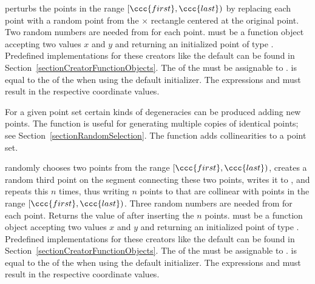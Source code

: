 { perturbs the points in the range $[\ccc{first},\ccc{last})$ by
  replacing each point with a random point from the 
   $\times$  rectangle centered at the original point.
  Two random numbers are needed from  for each point.
  \ccPrecond   {} must be a function object accepting two
     values $x$ and $y$ and returning an initialized point
     of type . Predefined implementations for these
    creators like the default can be found in
    Section~\ref{sectionCreatorFunctionObjects}. The  of the
     must be assignable to .
     is equal to the  of the
     when using the default initializer.
    The expressions  and
     must result in the respective
    coordinate values.
}

\ccModifierCrossRefOff
{}
\ccModifierCrossRefOn

For a given point set certain kinds of degeneracies can be produced
adding new points. The  function is
useful for generating multiple copies of identical points; see
Section~\ref{sectionRandomSelection}. The
 function adds collinearities to
a point set.


\def\ccLongParamLayout{\ccTrue}
{ randomly chooses two points from the range $[\ccc{first},\ccc{last})$,
    creates a random third point on the segment connecting these two
    points, writes it to , and repeats this $n$ times, thus
    writing $n$ points to  that are collinear with points
    in the range $[\ccc{first},\ccc{last})$.
    Three random numbers are needed from  for each point.
    Returns the value of  after inserting the $n$ points.
  \ccPrecond  {} must be a function object accepting two
     values $x$ and $y$ and returning an initialized point
     of type . Predefined implementations for these
    creators like the default can be found in
    Section~\ref{sectionCreatorFunctionObjects}. The  of the
     must be assignable to .
     is equal to the  of the
     when using the default initializer.
    The expressions  and
     must result in the respective
    coordinate values.
}
\def\ccLongParamLayout{\ccFalse}


